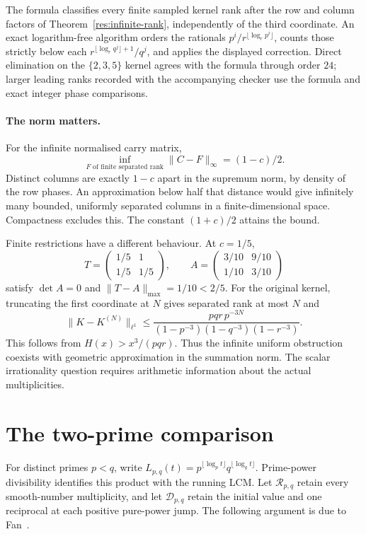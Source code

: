 \documentclass[11pt]{article}
\begin{document}
The formula classifies every finite sampled kernel rank after the row and
column factors of Theorem~\ref{res:infinite-rank}, independently of the third
coordinate.  An exact logarithm-free algorithm orders the rationals
$p^i/r^{\lfloor\log_r p^i\rfloor}$, counts those strictly below each
$r^{\lfloor\log_r q^j\rfloor+1}/q^j$, and applies the displayed correction.
Direct elimination on the $\{2,3,5\}$ kernel agrees with the formula through
order $24$; larger leading ranks recorded with the accompanying checker use
the formula and exact integer phase comparisons.


\paragraph{The norm matters.}
For the infinite normalised carry matrix,
\[
 \inf_{F\text{ of finite separated rank}}\|C-F\|_\infty=(1-c)/2.
\]
Distinct columns are exactly $1-c$ apart in the supremum norm, by density
of the row phases. An approximation below half that distance would give
infinitely many bounded, uniformly separated columns in a finite-dimensional
space. Compactness excludes this. The constant $(1+c)/2$ attains the bound.

Finite restrictions have a different behaviour. At $c=1/5$,
\[
 T=\begin{pmatrix}1/5&1\\1/5&1/5\end{pmatrix},\qquad
 A=\begin{pmatrix}3/10&9/10\\1/10&3/10\end{pmatrix}
\]
satisfy $\det A=0$ and $\|T-A\|_{\max}=1/10<2/5$.
For the original kernel, truncating the first coordinate at $N$ gives
separated rank at most $N$ and
\[
 \|K-K^{(N)}\|_{\ell^1}
 \le\frac{pqr\,p^{-3N}}{(1-p^{-3})(1-q^{-3})(1-r^{-3})}.
\]
This follows from $H(x)>x^3/(pqr)$. Thus the infinite uniform obstruction
coexists with geometric approximation in the summation norm. The scalar
irrationality question requires arithmetic information about the actual
multiplicities.

\section{The two-prime comparison}\label{sec:two-prime}
For distinct primes $p<q$, write
$L_{p,q}(t)=p^{\lfloor\log_p t\rfloor}q^{\lfloor\log_q t\rfloor}$.
Prime-power divisibility identifies this product with the running LCM.
Let $\mathcal R_{p,q}$ retain every smooth-number multiplicity, and let
$\mathcal D_{p,q}$ retain the initial value and one reciprocal at each
positive pure-power jump.  The following argument is due to
Fan~\cite{fan2026comment}.
\end{document}
